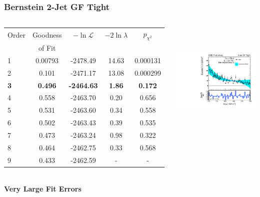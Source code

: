 \documentclass{beamer}
\begin{document}
\begin{frame}
\frametitle{Bernstein 2-Jet GF Tight}
  \begin{columns}[c]
   \column{60mm}
      \begin{center}
      \tiny
\begin{tabular}{|l|c|c|c|c|} \hline
Order & Goodness & $-\ln\mathcal{L}$ & $-2\ln\lambda$ & $p_{\chi^2}$ \\ 
 & of Fit  &  & &  \\ \hline \hline
1 & 0.00793 & -2478.49 & 14.63 & 0.000131  \\ \hline
2 & 0.101 & -2471.17 & 13.08 & 0.000299  \\ \hline
\bf 3 & \bf 0.496 & \bf -2464.63 & \bf 1.86 & \bf 0.172  \\ \hline
4 & 0.558 & -2463.70 & 0.20 & 0.656  \\ \hline
5 & 0.531 & -2463.60 & 0.34 & 0.558  \\ \hline
6 & 0.502 & -2463.43 & 0.39 & 0.535  \\ \hline
7 & 0.473 & -2463.24 & 0.98 & 0.322  \\ \hline
8 & 0.464 & -2462.75 & 0.33 & 0.568  \\ \hline
9 & 0.433 & -2462.59 & - & -  \\ \hline
\end{tabular}
\\
\normalsize
\vspace{2em}
\bf
Very Large Fit Errors
      \end{center}
   \column{60mm}
      \begin{center}
        \includegraphics[height=55mm]{redoWholeRange/orderBernstein/order_Shape_Jet2CutsGFPass_Bernstein3}
      \end{center}
  \end{columns}
  \begin{center}
  \end{center}
\end{frame}
\end{document}
